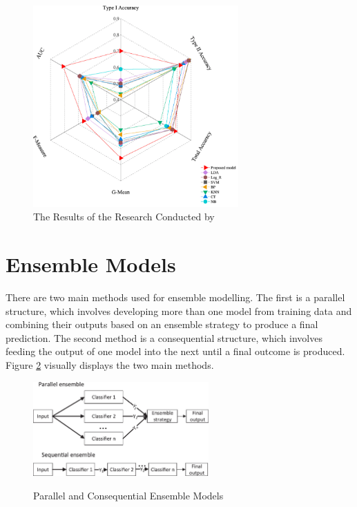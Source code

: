 \vspace{15pt}

\begin{figure}[!htb]
\centering
\includegraphics[width=0.7\textwidth]{images/shen.png}
\caption{The Results of the Research Conducted by \textcite{NNShen}}
\label{fig:shen}
\end{figure}

\vspace{15pt}


\section{Ensemble Models}

There are two main methods used for ensemble modelling. The first is a parallel structure, which involves developing more than one model from training data and combining their outputs based on an ensemble strategy to produce a final prediction. The second method is a consequential structure, which involves feeding the output of one model into the next until a final outcome is produced. Figure \ref{fig:ensemble} visually displays the two main methods. 

\vspace{15pt}

\begin{figure}[!htb]
\centering
\includegraphics[width=0.6\textwidth]{images/ensemble.jpg}
\caption{Parallel and Consequential Ensemble Models}
\parencite{Ensemble}
\label{fig:ensemble}
\end{figure}

